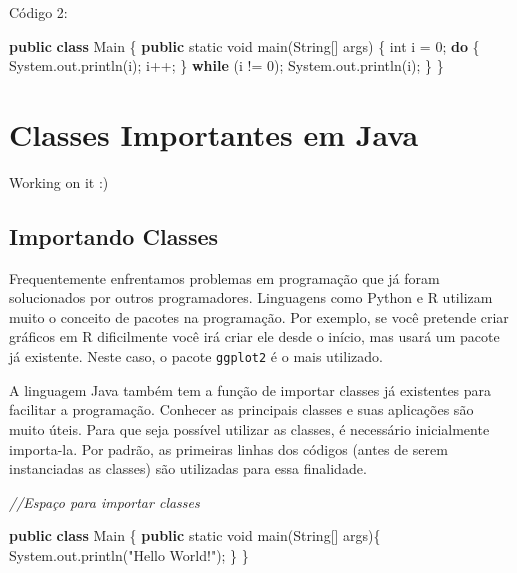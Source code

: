 \documentclass[
]{book}
\newenvironment{Shaded}{\begin{snugshade}}{\end{snugshade}}
\newcommand{\BuiltInTok}[1]{#1}
\newcommand{\CommentTok}[1]{\textcolor[rgb]{0.56,0.35,0.01}{\textit{#1}}}
\newcommand{\DataTypeTok}[1]{\textcolor[rgb]{0.13,0.29,0.53}{#1}}
\newcommand{\DecValTok}[1]{\textcolor[rgb]{0.00,0.00,0.81}{#1}}
\newcommand{\FunctionTok}[1]{\textcolor[rgb]{0.00,0.00,0.00}{#1}}
\newcommand{\KeywordTok}[1]{\textcolor[rgb]{0.13,0.29,0.53}{\textbf{#1}}}
\newcommand{\NormalTok}[1]{#1}
\newcommand{\StringTok}[1]{\textcolor[rgb]{0.31,0.60,0.02}{#1}}
\begin{document}
Código 2:

\begin{Shaded}
\begin{Highlighting}[]
\KeywordTok{public} \KeywordTok{class}\NormalTok{ Main \{}
    \KeywordTok{public} \DataTypeTok{static} \DataTypeTok{void} \FunctionTok{main}\NormalTok{(}\BuiltInTok{String}\NormalTok{[] args) \{}
        \DataTypeTok{int}\NormalTok{ i = }\DecValTok{0}\NormalTok{;}
        \KeywordTok{do}\NormalTok{ \{}
            \BuiltInTok{System}\NormalTok{.}\FunctionTok{out}\NormalTok{.}\FunctionTok{println}\NormalTok{(i);}
\NormalTok{            i++;}
\NormalTok{        \} }\KeywordTok{while}\NormalTok{ (i != }\DecValTok{0}\NormalTok{);}
        \BuiltInTok{System}\NormalTok{.}\FunctionTok{out}\NormalTok{.}\FunctionTok{println}\NormalTok{(i);}
\NormalTok{    \}}
\NormalTok{\}}
\end{Highlighting}
\end{Shaded}

\hypertarget{classes-importantes-em-java}{%
\chapter{Classes Importantes em Java}\label{classes-importantes-em-java}}

Working on it :)

\hypertarget{importando-classes}{%
\section{Importando Classes}\label{importando-classes}}

Frequentemente enfrentamos problemas em programação que já foram solucionados por outros programadores. Linguagens como Python e R utilizam muito o conceito de pacotes na programação. Por exemplo, se você pretende criar gráficos em R dificilmente você irá criar ele desde o início, mas usará um pacote já existente. Neste caso, o pacote \texttt{ggplot2} é o mais utilizado.

A linguagem Java também tem a função de importar classes já existentes para facilitar a programação. Conhecer as principais classes e suas aplicações são muito úteis. Para que seja possível utilizar as classes, é necessário inicialmente importa-la. Por padrão, as primeiras linhas dos códigos (antes de serem instanciadas as classes) são utilizadas para essa finalidade.

\begin{Shaded}
\begin{Highlighting}[]
\CommentTok{//Espaço para importar classes}

\KeywordTok{public} \KeywordTok{class}\NormalTok{ Main \{}
    \KeywordTok{public} \DataTypeTok{static} \DataTypeTok{void} \FunctionTok{main}\NormalTok{(}\BuiltInTok{String}\NormalTok{[] args)\{}
        \BuiltInTok{System}\NormalTok{.}\FunctionTok{out}\NormalTok{.}\FunctionTok{println}\NormalTok{(}\StringTok{"Hello World!"}\NormalTok{);}
\NormalTok{    \}}
\NormalTok{\}}
\end{Highlighting}
\end{Shaded}
\end{document}

